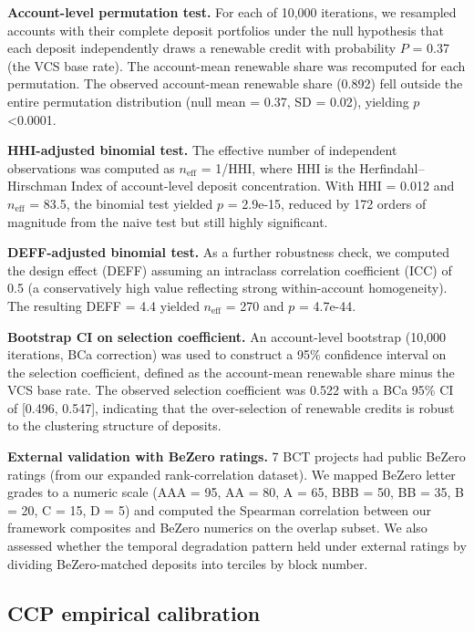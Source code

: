 \documentclass[11pt]{article}
\begin{document}
\textbf{Account-level permutation test.} For each of 10,000 iterations, we resampled accounts with their complete deposit portfolios under the null hypothesis that each deposit independently draws a renewable credit with probability $P$ = 0.37 (the VCS base rate). The account-mean renewable share was recomputed for each permutation. The observed account-mean renewable share (0.892) fell outside the entire permutation distribution (null mean = 0.37, SD = 0.02), yielding $p$ <0.0001.

\textbf{HHI-adjusted binomial test.} The effective number of independent observations was computed as $n_{\text{eff}}$ = 1/HHI, where HHI is the Herfindahl--Hirschman Index of account-level deposit concentration. With HHI = 0.012 and $n_{\text{eff}}$ = 83.5, the binomial test yielded $p$ = 2.9e-15, reduced by 172 orders of magnitude from the naive test but still highly significant.

\textbf{DEFF-adjusted binomial test.} As a further robustness check, we computed the design effect (DEFF) assuming an intraclass correlation coefficient (ICC) of 0.5 (a conservatively high value reflecting strong within-account homogeneity). The resulting DEFF = 4.4 yielded $n_{\text{eff}}$ = 270 and $p$ = 4.7e-44.

\textbf{Bootstrap CI on selection coefficient.} An account-level bootstrap (10,000 iterations, BCa correction) was used to construct a 95\% confidence interval on the selection coefficient, defined as the account-mean renewable share minus the VCS base rate. The observed selection coefficient was 0.522 with a BCa 95\% CI of [0.496, 0.547], indicating that the over-selection of renewable credits is robust to the clustering structure of deposits.

\textbf{External validation with BeZero ratings.} 7 BCT projects had public BeZero ratings (from our expanded rank-correlation dataset). We mapped BeZero letter grades to a numeric scale (AAA = 95, AA = 80, A = 65, BBB = 50, BB = 35, B = 20, C = 15, D = 5) and computed the Spearman correlation between our framework composites and BeZero numerics on the overlap subset. We also assessed whether the temporal degradation pattern held under external ratings by dividing BeZero-matched deposits into terciles by block number.

\subsection*{CCP empirical calibration}
\end{document}
